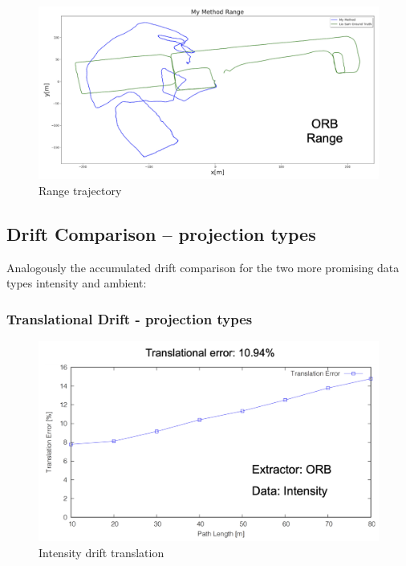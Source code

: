 {{{        \begin{figure}[!ht]
            \centering
            \includegraphics[scale = 0.5]{images/comparison_appendix/Ranget.png}
            \caption{Range trajectory}
            \label{fig:range_trajectory_method}
        \end{figure}

    }
    \clearpage

    \subsection{Drift Comparison – projection types}{
        Analogously the accumulated drift comparison for the two more promising data types intensity and ambient:
        \subsubsection{Translational Drift - projection types}{
            \begin{figure}[!ht]
                \centering
                \includegraphics[scale = 0.4]{images/comparison_appendix/orb_drift_transl.png}
                \caption{Intensity drift translation}
                \label{fig:intensity_drift_transl}
            \end{figure}

}}}}
